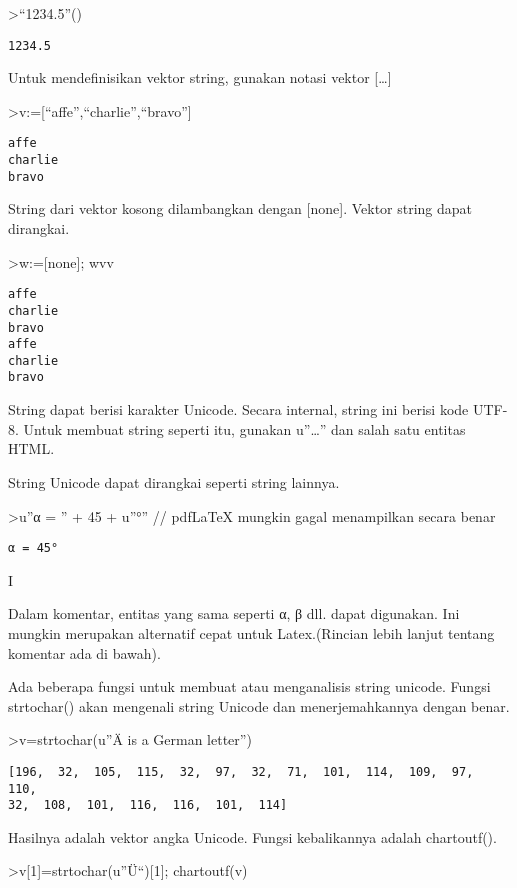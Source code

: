 \documentclass[
]{book}
\begin{document}
\textgreater{}``1234.5''()

\begin{verbatim}
1234.5
\end{verbatim}

Untuk mendefinisikan vektor string, gunakan notasi vektor {[}\ldots{]}

\textgreater v:={[}``affe'',``charlie'',``bravo''{]}

\begin{verbatim}
affe
charlie
bravo
\end{verbatim}

String dari vektor kosong dilambangkan dengan {[}none{]}. Vektor string dapat dirangkai.

\textgreater w:={[}none{]}; w\textbar v\textbar v

\begin{verbatim}
affe
charlie
bravo
affe
charlie
bravo
\end{verbatim}

String dapat berisi karakter Unicode. Secara internal, string ini berisi kode UTF-8. Untuk membuat string seperti itu, gunakan u''\ldots'' dan salah satu entitas HTML.

String Unicode dapat dirangkai seperti string lainnya.

\textgreater u''α = '' + 45 + u''°'' // pdfLaTeX mungkin gagal menampilkan secara benar

\begin{verbatim}
α = 45°
\end{verbatim}

I

Dalam komentar, entitas yang sama seperti α, β dll. dapat digunakan. Ini mungkin merupakan alternatif cepat untuk Latex.(Rincian lebih lanjut tentang komentar ada di bawah).

Ada beberapa fungsi untuk membuat atau menganalisis string unicode. Fungsi strtochar() akan mengenali string Unicode dan menerjemahkannya dengan benar.

\textgreater v=strtochar(u''Ä is a German letter'')

\begin{verbatim}
[196,  32,  105,  115,  32,  97,  32,  71,  101,  114,  109,  97,  110,
32,  108,  101,  116,  116,  101,  114]
\end{verbatim}

Hasilnya adalah vektor angka Unicode. Fungsi kebalikannya adalah chartoutf().

\textgreater v{[}1{]}=strtochar(u''Ü``){[}1{]}; chartoutf(v)
\end{document}
